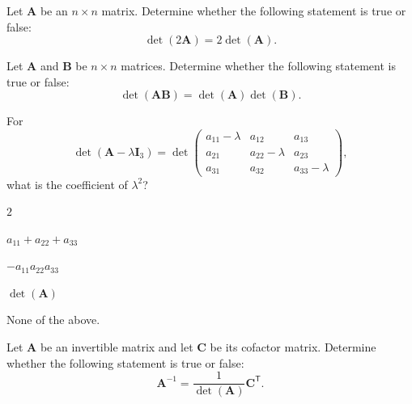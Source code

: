 \documentclass[11pt,oneside]{article}
\begin{document}
\begin{problem}
Let $\mathbf A$ be an $n\times n$ matrix. Determine whether the following statement is true or false:
\[
\det(2\mathbf A)=2\det(\mathbf A).
\]
\end{problem}

\begin{problem}
Let $\mathbf A$ and $\mathbf B$ be $n\times n$ matrices. Determine whether the following statement is true or false:
\[
\det(\mathbf A\mathbf B)=\det(\mathbf A)\det(\mathbf B).
\]
\end{problem}

\begin{problem}
For
\[
\det(\mathbf A-\lambda\mathbf I_3)
=
\det
\begin{pmatrix}
a_{11}-\lambda&a_{12}&a_{13}\\
a_{21}&a_{22}-\lambda&a_{23}\\
a_{31}&a_{32}&a_{33}-\lambda
\end{pmatrix},
\]
what is the coefficient of $\lambda^2$?
\begin{problemchoices}
\item $2$
\item $a_{11}+a_{22}+a_{33}$
\item $-a_{11}a_{22}a_{33}$
\item $\det(\mathbf A)$
\item None of the above.
\end{problemchoices}
\end{problem}

\begin{problem}
Let $\mathbf A$ be an invertible matrix and let $\mathbf C$ be its cofactor matrix. Determine whether the following statement is true or false:
\[
\mathbf A^{-1}=\frac{1}{\det(\mathbf A)}\mathbf C^{\mathsf T}.
\]
\end{problem}
\end{document}
